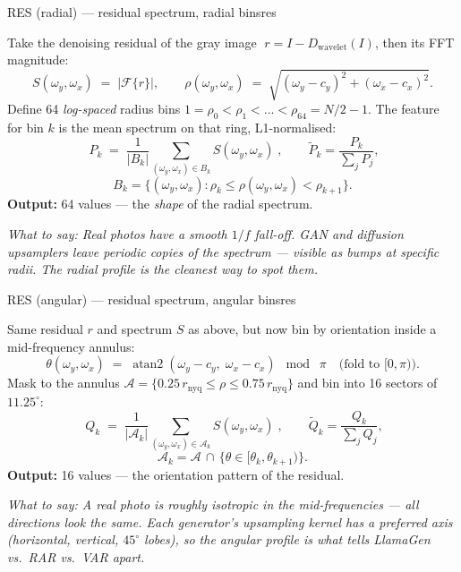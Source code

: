 \documentclass[12pt]{article}
\newcommand{\say}[1]{\par\smallskip\textit{\small \textcolor{black!60}{What to say:} #1}}
\begin{document}
\bigskip
\begin{lensbox}{RES (radial) --- residual spectrum, radial bins}{res}

Take the denoising residual of the gray image
$\;r = I - D_{\text{wavelet}}(I)$, then its FFT magnitude:
\[
S(\omega_y,\omega_x) \;=\; \bigl|\mathcal{F}\{r\}\bigr|,
\qquad
\rho(\omega_y,\omega_x) \;=\; \sqrt{(\omega_y-c_y)^{2}+(\omega_x-c_x)^{2}}.
\]
Define 64 \emph{log-spaced} radius bins
$1 = \rho_0 < \rho_1 < \dots < \rho_{64} = N/2-1$. The feature for bin $k$
is the mean spectrum on that ring, L1-normalised:
\[
\boxed{\;
P_k \;=\; \frac{1}{|B_k|}\!\!\sum_{(\omega_y,\omega_x)\in B_k}\!\!
            S(\omega_y,\omega_x)\;},
\qquad
\tilde P_k = \frac{P_k}{\sum_j P_j},
\]
\[
B_k = \{(\omega_y,\omega_x):\rho_k\le \rho(\omega_y,\omega_x)<\rho_{k+1}\}.
\]
\textbf{Output:} 64 values --- the \emph{shape} of the radial spectrum.

\say{Real photos have a smooth $1/f$ fall-off. GAN and diffusion
\emph{upsamplers} leave periodic copies of the spectrum --- visible as
bumps at specific radii. The radial profile is the cleanest way to spot
them.}
\end{lensbox}

\clearpage
\begin{lensbox}{RES (angular) --- residual spectrum, angular bins}{res}

Same residual $r$ and spectrum $S$ as above, but now bin by orientation
inside a mid-frequency annulus:
\[
\theta(\omega_y,\omega_x) \;=\; \operatorname{atan2}(\omega_y-c_y,\;\omega_x-c_x)\;\bmod\;\pi
\quad\text{(fold to }[0,\pi)\text{)}.
\]
Mask to the annulus $\mathcal{A} = \{0.25\,r_{\text{nyq}} \le \rho \le 0.75\,r_{\text{nyq}}\}$
and bin into 16 sectors of $11.25^{\circ}$:
\[
\boxed{\;
Q_k \;=\; \frac{1}{|\mathcal{A}_k|}\!\!\sum_{(\omega_y,\omega_x)\in\mathcal{A}_k}
   \!\! S(\omega_y,\omega_x)\;},
\qquad
\tilde Q_k = \frac{Q_k}{\sum_j Q_j},
\]
\[
\mathcal{A}_k = \mathcal{A}\,\cap\,\{\theta\in[\theta_k,\theta_{k+1})\}.
\]
\textbf{Output:} 16 values --- the orientation pattern of the residual.

\say{A real photo is roughly \emph{isotropic} in the mid-frequencies ---
all directions look the same. Each generator's upsampling kernel has a
preferred axis (horizontal, vertical, $45^{\circ}$ lobes), so the angular
profile is what tells \emph{LlamaGen vs.\ RAR vs.\ VAR} apart.}
\end{lensbox}
\end{document}
